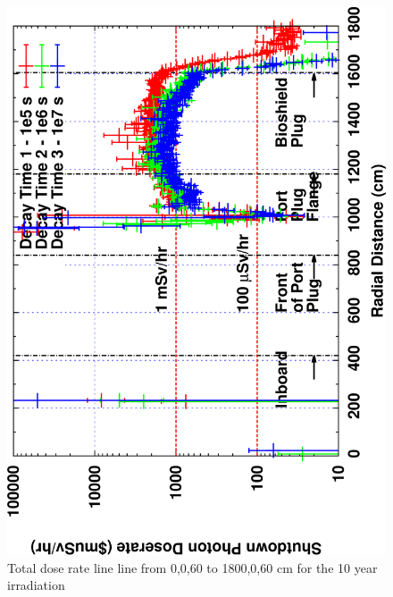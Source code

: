 \documentclass[12pt]{article}
\begin{document}
\begin{figure}[ht!]
\centering
\includegraphics[clip,scale=0.12,angle=-90]{../plots/photon_lineout/10yr/no-b4c_10yr.png}
\caption{Total dose rate line line from 0,0,60 to 1800,0,60 cm for the 10 year irradiation}
\label{fig:photons_10y_nob4c_dose}
\end{figure}
\clearpage
\newpage
\end{document}

